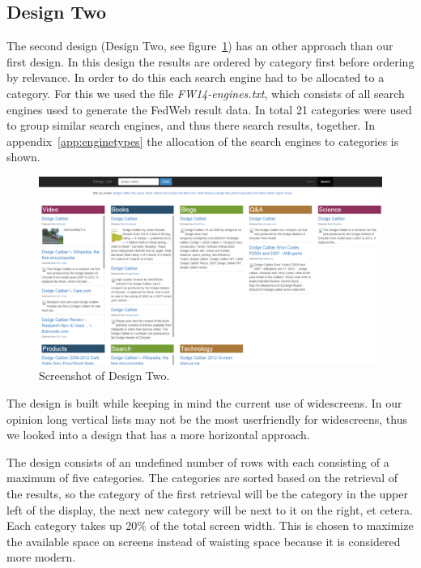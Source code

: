 \documentclass[12pt]{article}
\begin{document}
\subsection{Design Two}
\label{sec:layoutRik}
The second design (Design Two, see figure~\ref{fig:designTwo}) has an other approach than our first design.
In this design the results are ordered by category first before ordering by relevance.
In order to do this each search engine had to be allocated to a category.
For this we used the file \textit{FW14-engines.txt}, which consists of all search engines used to generate the FedWeb result data.
In total 21 categories were used to group similar search engines, and thus there search results, together.
In appendix~\ref{app:enginetypes} the allocation of the search engines to categories is shown.

\begin{figure}[h!]
  \centering
    \includegraphics[width=1.0\textwidth]{designTwo.png}
  \caption{Screenshot of Design Two.}
\label{fig:designTwo}
\end{figure}

The design is built while keeping in mind the current use of widescreens.
In our opinion long vertical lists may not be the most userfriendly for widescreens, thus we looked into a design that has a more horizontal approach.

The design consists of an undefined number of rows with each consisting of a maximum of five categories.
The categories are sorted based on the retrieval of the results, so the category of the first retrieval will be the category in the upper left of the display, the next new category will be next to it on the right, et cetera.
Each category takes up 20\% of the total screen width.
This is chosen to maximize the available space on screens instead of waisting space because it is considered more modern.
\end{document}
